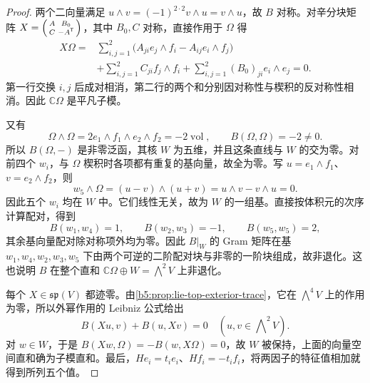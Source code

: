 \begin{proof}
	两个二向量满足 \(u\wedge v=(-1)^{2\cdot2}v\wedge u=v\wedge u\)，故 \(B\) 对称。对辛分块矩阵
	\(X=\begin{psmallmatrix}A&B_0\\C&-A^{\mathsf T}\end{psmallmatrix}\)，其中 \(B_0,C\) 对称，直接作用于 \(\Omega\) 得
	\[
		\begin{aligned}
			X\Omega={}&\sum_{i,j=1}^2 \bigl(A_{ji}e_j\wedge f_i-A_{ij}e_i\wedge f_j\bigr)\\
			&+\sum_{i,j=1}^2 C_{ji}f_j\wedge f_i +\sum_{i,j=1}^2 (B_0)_{ji}e_i\wedge e_j=0.
		\end{aligned}
	\]
	第一行交换 \(i,j\) 后成对相消，第二行的两个和分别因对称性与楔积的反对称性相消。因此 \(\mathbb C\Omega\) 是平凡子模。

	又有
	\[
		\Omega\wedge\Omega =2e_1\wedge f_1\wedge e_2\wedge f_2=-2\operatorname{vol}, \qquad B(\Omega,\Omega)=-2\ne0.
	\]
	所以 \(B(\Omega,-)\) 是非零泛函，其核 \(W\) 为五维，并且这条直线与 \(W\) 的交为零。对前四个 \(w_i\)，与 \(\Omega\) 楔积时各项都有重复的基向量，故全为零。写 \(u=e_1\wedge f_1\)、\(v=e_2\wedge f_2\)，则
	\[
		w_5\wedge\Omega=(u-v)\wedge(u+v) =u\wedge v-v\wedge u=0.
	\]
	因此五个 \(w_i\) 均在 \(W\) 中。它们线性无关，故为 \(W\) 的一组基。直接按体积元的次序计算配对，得到
	\[
		B(w_1,w_4)=1,\qquad B(w_2,w_3)=-1,\qquad B(w_5,w_5)=2,
	\]
	其余基向量配对除对称项外均为零。因此 \(B|_W\) 的 Gram 矩阵在基 \(w_1,w_4,w_2,w_3,w_5\) 下由两个可逆的二阶配对块与非零的一阶块组成，故非退化。这也说明 \(B\) 在整个直和 \(\mathbb C\Omega\oplus W=\bigwedge^2V\) 上非退化。

	每个 \(X\in\mathfrak{sp}(V)\) 都迹零。由\cref{b5:prop:lie-top-exterior-trace}，它在 \(\bigwedge^4V\) 上的作用为零，所以外幂作用的 Leibniz 公式给出
	\[
		B(Xu,v)+B(u,Xv)=0\quad(u,v\in\bigwedge\nolimits^2V).
	\]
	对 \(w\in W\)，于是 \(B(Xw,\Omega)=-B(w,X\Omega)=0\)，故 \(W\) 被保持，上面的向量空间直和确为子模直和。最后，\(He_i=t_ie_i\)、\(Hf_i=-t_if_i\)，将两因子的特征值相加就得到所列五个值。
\end{proof}

